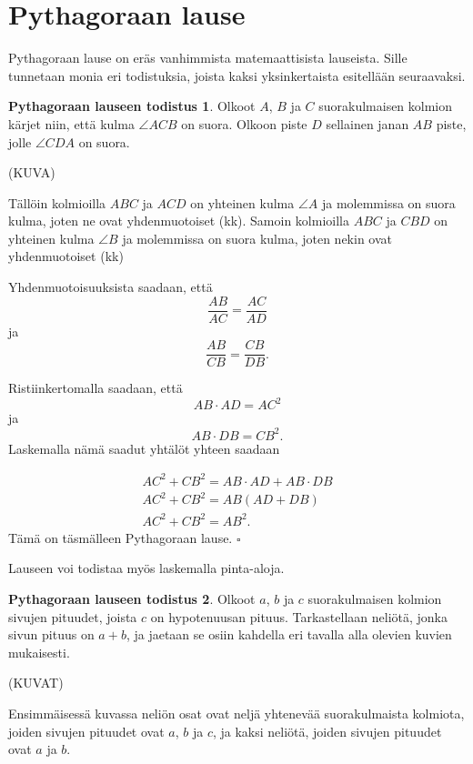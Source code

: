 \section*{Pythagoraan lause}

Pythagoraan lause on eräs vanhimmista matemaattisista lauseista. Sille tunnetaan monia eri
todistuksia, joista kaksi yksinkertaista esitellään seuraavaksi.


\textbf{Pythagoraan lauseen todistus 1}. Olkoot $A$, $B$ ja $C$ suorakulmaisen kolmion
kärjet niin, että kulma $\angle ACB$ on suora. Olkoon piste $D$ sellainen janan $AB$ piste,
jolle $\angle CDA$ on suora.

(KUVA)

Tällöin kolmioilla $ABC$ ja $ACD$ on yhteinen kulma $\angle A$ ja molemmissa on suora kulma, joten ne ovat yhdenmuotoiset (kk). Samoin kolmioilla $ABC$ ja $CBD$ on yhteinen kulma
$\angle B$ ja molemmissa on suora kulma, joten nekin ovat yhdenmuotoiset (kk)

Yhdenmuotoisuuksista saadaan, että
\[
\frac{AB}{AC} = \frac{AC}{AD}
\]
ja
\[
\frac{AB}{CB} = \frac{CB}{DB}.
\]

Ristiinkertomalla saadaan, että
\[
AB \cdot AD = AC^2
\]
ja
\[
AB \cdot DB = CB^2.
\]
Laskemalla nämä saadut yhtälöt yhteen saadaan

\begin{align*}
AC^2 + CB^2  = AB \cdot AD + AB \cdot DB \\
AC^2 + CB^2  = AB(AD + DB) \\
AC^2 + CB^2  = AB^2.
\end{align*}
Tämä on täsmälleen Pythagoraan lause. $\square $

Lauseen voi todistaa myös laskemalla pinta-aloja.

\textbf{Pythagoraan lauseen todistus 2}. Olkoot $a$, $b$ ja $c$ suorakulmaisen kolmion
sivujen pituudet, joista $c$ on hypotenuusan pituus. Tarkastellaan neliötä, jonka sivun
pituus on $a+b$, ja jaetaan se osiin kahdella eri tavalla alla olevien kuvien mukaisesti.

(KUVAT)

Ensimmäisessä kuvassa neliön osat ovat neljä yhtenevää suorakulmaista kolmiota, joiden
sivujen pituudet ovat $a$, $b$ ja $c$, ja kaksi neliötä, joiden sivujen pituudet ovat $a$ ja
$b$.

